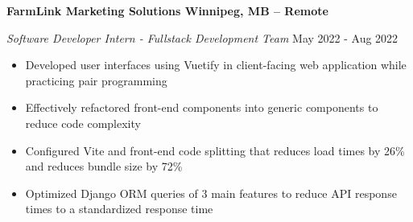 \textbf{FarmLink Marketing Solutions \hfill Winnipeg, MB -- Remote}\par
\textit{Software Developer Intern - Fullstack Development Team} \hfill May 2022 - Aug 2022

\begin{itemize}
    \item Developed user interfaces using Vuetify in client-facing web application while practicing pair programming
    \item Effectively refactored front-end components into generic components to reduce code complexity
    \item Configured Vite and front-end code splitting that reduces load times by 26\% and reduces bundle size by 72\%
    \item Optimized Django ORM queries of 3 main features to reduce API response times to a standardized response time
\end{itemize}
\vspace{0.1cm} \par
